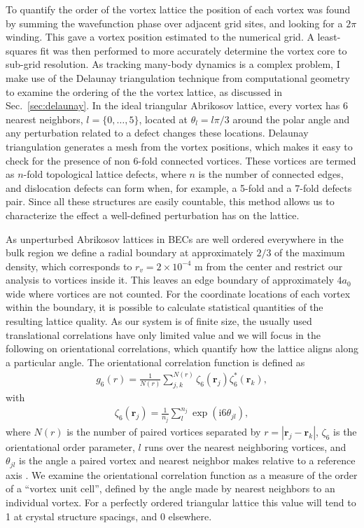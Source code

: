To quantify the order of the vortex lattice the position of each vortex was found by summing the wavefunction phase over adjacent grid sites, and looking for a $2\pi$ winding. This gave a vortex position estimated to the numerical grid. A least-squares fit was then performed to more accurately determine the vortex core to sub-grid resolution. As tracking many-body dynamics is a complex problem, I make use of the Delaunay triangulation technique from computational geometry to examine the ordering of the the vortex lattice, as discussed in Sec.~\ref{sec:delaunay}. In the ideal triangular Abrikosov lattice, every vortex has 6 nearest neighbors, $l=\{0,\ldots,5\}$, located at $\theta_l=l\pi/3$ around the polar angle and any perturbation related to a defect changes these locations. Delaunay triangulation generates a mesh from the vortex positions, which makes it easy to check for the presence of non 6-fold connected vortices. These vortices are termed as $n$-fold topological lattice defects, where $n$ is the number of connected edges, and dislocation defects can form when, for example, a 5-fold and a 7-fold defects pair. Since all these structures are easily countable, this method allows us to characterize the effect a well-defined perturbation has on the lattice.

As unperturbed Abrikosov lattices in BECs are well ordered everywhere in the bulk region \cite{Vtx:Anglin_arxiv_2002} we define a radial boundary at approximately $2/3$ of the maximum density, which corresponds to $r_v=2\times 10^{-4}$ m from the center and restrict our analysis to vortices inside it. This leaves an edge boundary of approximately $4a_0$ wide where vortices are not counted. For the coordinate locations of each vortex within the boundary, it is possible to calculate statistical quantities of the resulting lattice quality. As our system is of finite size, the usually used translational correlations have only limited value and we will focus in the following on orientational correlations, which quantify how the lattice aligns along a particular angle. The orientational correlation function is defined as
\begin{align}
	g_6(r) = \frac{1}{N(r)}\displaystyle\sum\limits_{j,k}^{N(r)}\zeta_6(\mathbf{r}_j)\zeta_6^{*}(\mathbf{r}_k),
\end{align}
with
\begin{align}
	\zeta_6(\mathbf{r}_{j}) =  \frac{1}{n_j}\displaystyle\sum\limits_{l}^{n_j}\exp(\mathrm{i}6\theta_{jl}),
\end{align}
where $N(r)$ is the number of paired vortices separated by $r=|\mathbf{r}_j - \mathbf{r}_k|$, $\zeta_6$ is the orientational order parameter, $l$ runs over the nearest neighboring vortices, and $\theta_{jl}$ is the angle a paired vortex and nearest neighbor makes relative to a reference axis \cite{Guillamon_nat_2014}. We examine the orientational correlation function as a measure of the order of a ``vortex unit cell'', defined by the angle made by nearest neighbors to an individual vortex. For a perfectly ordered triangular lattice this value will tend to 1 at crystal structure spacings, and 0 elsewhere.


